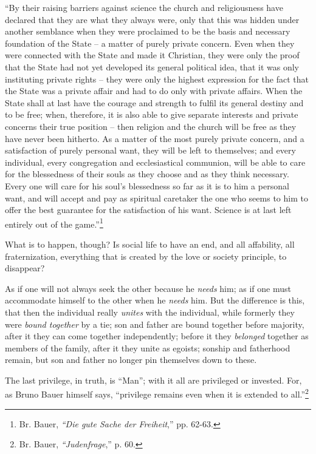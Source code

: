 \documentclass[12pt,a4paper]{book}
\begin{document}
``By their raising barriers against science the church and religiousness have 
declared that they are what they always were, only that this was hidden under 
another semblance when they were proclaimed to be the basis and necessary 
foundation of the State -- a matter of purely private concern. Even when they 
were connected with the State and made it Christian, they were only the proof 
that the State had not yet developed its general political idea, that it was 
only instituting private rights -- they were only the highest expression for 
the fact that the State was a private affair and had to do only with private 
affairs. When the State shall at last have the courage and strength to fulfil 
its general destiny and to be free; when, therefore, it is also able to give 
separate interests and private concerns their true position -- then religion 
and the church will be free as they have never been hitherto. As a matter of 
the most purely private concern, and a satisfaction of purely personal want, 
they will be left to themselves; and every individual, every congregation and 
ecclesiastical communion, will be able to care for the blessedness of their 
souls as they choose and as they think necessary. Every one will care for his 
soul's blessedness so far as it is to him a personal want, and will accept and 
pay as spiritual caretaker the one who seems to him to offer the best 
guarantee for the satisfaction of his want. Science is at last left entirely 
out of the game.''\footnote{Br. Bauer, \textit{``Die gute Sache der 
Freiheit},'' pp. 62-63.}

What is to happen, though? Is social life to have an end, and all affability, 
all fraternization, everything that is created by the love or society 
principle, to disappear?

As if one will not always seek the other because he \textit{needs} him; as if 
one must accommodate himself to the other when he \textit{needs} him. But the 
difference is this, that then the individual really \textit{unites} with the 
individual, while formerly they were \textit{bound together} by a tie; son and 
father are bound together before majority, after it they can come together 
independently; before it they \textit{belonged} together as members of the 
family, after it they unite as egoists; sonship and fatherhood remain, but son 
and father no longer pin themselves down to these.

The last privilege, in truth, is ``Man''; with it all are privileged or 
invested. For, as Bruno Bauer himself says, ``privilege remains even when it 
is extended to all.''\footnote{Br. Bauer, \textit{``Judenfrage},'' p. 60.}
\end{document}
